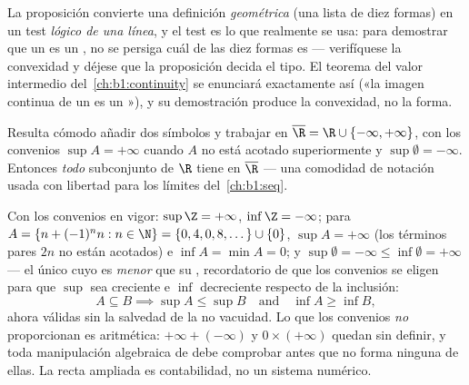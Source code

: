 \begin{remark}
La proposición convierte una definición \emph{geométrica} (una lista
de diez formas) en un test \emph{lógico de una línea}, y el test es lo
que realmente se usa: para demostrar que un  es un ,
no se persiga cuál de las diez formas es --- verifíquese la convexidad
y déjese que la proposición decida el tipo. El teorema del valor
intermedio del~\cref{ch:b1:continuity} se enunciará exactamente así
(«la imagen continua de un  es un »), y su
demostración produce la convexidad, no la forma.
\end{remark}

\begin{remark}
Resulta cómodo añadir dos símbolos y trabajar en
$\overline\R = \R \cup \{-\infty, +\infty\}$, con los convenios
$\sup A = +\infty$ cuando $A$ no está acotado superiormente y
$\sup \emptyset = -\infty$. Entonces \emph{todo} subconjunto de $\R$
tiene  en $\overline\R$ --- una comodidad de notación usada
con libertad para los límites del~\cref{ch:b1:seq}.
\end{remark}

\begin{example}\label{ex:b1:reals:extendedcompute}
Con los convenios en vigor: $\sup \Z = +\infty$, $\inf \Z = -\infty$;
para $A = \{n + (-1)^n n : n \in \N\} = \{0, 4, 0, 8, \dots\} \cup
\{0\}$, $\sup A = +\infty$ (los términos pares $2n$ no están acotados)
e $\inf A = \min A = 0$; y $\sup\emptyset = -\infty \leq \inf\emptyset
= +\infty$ --- el único  cuyo  es \emph{menor} que su
, recordatorio de que los convenios se eligen para que $\sup$
sea creciente e $\inf$ decreciente respecto de la inclusión:
\[
A \subseteq B \implies \sup A \leq \sup B
\quad\text{and}\quad \inf A \geq \inf B ,
\]
ahora válidas sin la salvedad de la no vacuidad. Lo que los convenios
\emph{no} proporcionan es aritmética: $+\infty + (-\infty)$ y
$0 \times (+\infty)$ quedan sin definir, y toda manipulación
algebraica de  debe comprobar antes que no forma ninguna de
ellas. La recta ampliada es contabilidad, no un sistema numérico.
\end{example}

